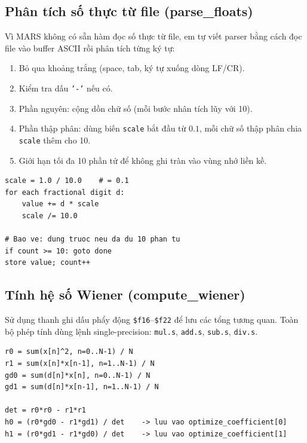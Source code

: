 \documentclass[twoside,final]{hcmut-report}
\begin{document}
\subsection{Phân tích số thực từ file (parse\_floats)}

Vì MARS không có sẵn hàm đọc số thực từ file, em tự viết parser
bằng cách đọc file vào buffer ASCII rồi phân tích từng ký tự:

\begin{enumerate}
  \item Bỏ qua khoảng trắng (space, tab, ký tự xuống dòng LF/CR).
  \item Kiểm tra dấu \texttt{'-'} nếu có.
  \item Phần nguyên: cộng dồn chữ số (mỗi bước nhân tích lũy với 10).
  \item Phần thập phân: dùng biến \texttt{scale} bắt đầu từ $0.1$,
        mỗi chữ số thập phân chia \texttt{scale} thêm cho 10.
  \item Giới hạn tối đa 10 phần tử để không ghi tràn vào vùng nhớ liền kề.
\end{enumerate}

\begin{lstlisting}[language={}, caption={Pseudo-code của parse\_floats}]
scale = 1.0 / 10.0    # = 0.1
for each fractional digit d:
    value += d * scale
    scale /= 10.0

# Bao ve: dung truoc neu da du 10 phan tu
if count >= 10: goto done
store value; count++
\end{lstlisting}

\subsection{Tính hệ số Wiener (compute\_wiener)}

Sử dụng thanh ghi dấu phẩy động \texttt{\$f16}--\texttt{\$f22} để lưu các
tổng tương quan. Toàn bộ phép tính dùng lệnh single-precision:
\texttt{mul.s}, \texttt{add.s}, \texttt{sub.s}, \texttt{div.s}.

\begin{lstlisting}[language={}, caption={Pseudo-code tính Wiener-Hopf}]
r0 = sum(x[n]^2, n=0..N-1) / N
r1 = sum(x[n]*x[n-1], n=1..N-1) / N
gd0 = sum(d[n]*x[n], n=0..N-1) / N
gd1 = sum(d[n]*x[n-1], n=1..N-1) / N

det = r0*r0 - r1*r1
h0 = (r0*gd0 - r1*gd1) / det    -> luu vao optimize_coefficient[0]
h1 = (r0*gd1 - r1*gd0) / det    -> luu vao optimize_coefficient[1]
\end{lstlisting}
\end{document}
